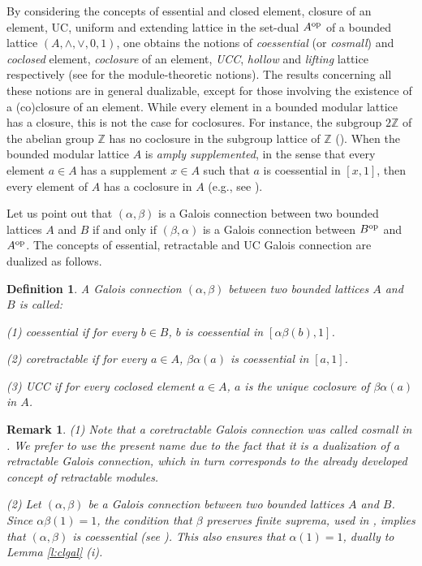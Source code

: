 \documentclass[11pt,a4paper]{amsart}
\newtheorem{defn}[theorem]{Definition}
\newtheorem{rem}[theorem]{Remark}
\begin{document}
By considering the concepts of essential and closed element, closure of an element, UC, uniform and extending lattice in
the set-dual $A^{\rm op}$ of a bounded lattice $(A,\wedge,\vee,0,1)$, one obtains the notions of {\it coessential} (or
{\it cosmall}) and {\it coclosed} element, {\it coclosure} of an element, {\it UCC}, {\it hollow} and {\it
lifting} lattice respectively (see \cite{DHSW} for the module-theoretic notions). The results concerning all these
notions are in general dualizable, except for those involving the existence of a (co)closure of an element. While every
element in a bounded modular lattice has a closure, this is not the case for coclosures. For instance, the subgroup
$2\mathbb{Z}$ of the abelian group $\mathbb{Z}$ has no coclosure in the subgroup lattice of $\mathbb{Z}$
(\cite[3.10]{CLVW}). When the bounded modular lattice $A$ is \emph{amply supplemented}, in the sense that every element
$a\in A$ has a supplement $x\in A$ such that $a$ is coessential in $[x,1]$, then every element of $A$ has a coclosure in
$A$ (e.g., see \cite[Lemma~3.3]{CIKO}). 

Let us point out that $(\alpha,\beta)$ is a Galois connection between two bounded lattices $A$ and $B$ if and only if
$(\beta,\alpha)$ is a Galois connection between $B^{\rm op}$ and $A^{\rm op}$. The concepts of essential,
retractable and UC Galois connection are dualized as follows. 

\begin{defn} \rm A Galois connection $(\alpha,\beta)$ between two bounded lattices $A$ and $B$ is called: 

(1) {\it coessential} if for every $b\in B$, $b$ is coessential in $[\alpha\beta(b),1]$.

(2) {\it coretractable} if for every $a\in A$, $\beta\alpha(a)$ is coessential in $[a,1]$.

(3) {\it UCC} if for every coclosed element $a\in A$, $a$ is the unique coclosure of $\beta\alpha(a)$ in $A$. 
\end{defn}

\begin{rem} \rm (1) Note that a coretractable Galois connection was called cosmall in \cite[Definition~2.6]{CIKO}. We
prefer to use the present name due to the fact that it is a dualization of a retractable Galois connection, which in
turn corresponds to the already developed concept of retractable modules. 

(2) Let $(\alpha,\beta)$ be a Galois connection between two bounded lattices $A$ and $B$. Since $\alpha\beta(1)=1$,
the condition that $\beta$ preserves finite suprema, used in \cite{CIKO}, implies that $(\alpha,\beta)$ is coessential
(see \cite[Lemma~2.5]{CIKO}). This also ensures that $\alpha(1)=1$, dually to Lemma \ref{l:clgal} (i).  
\end{rem}
\end{document}
